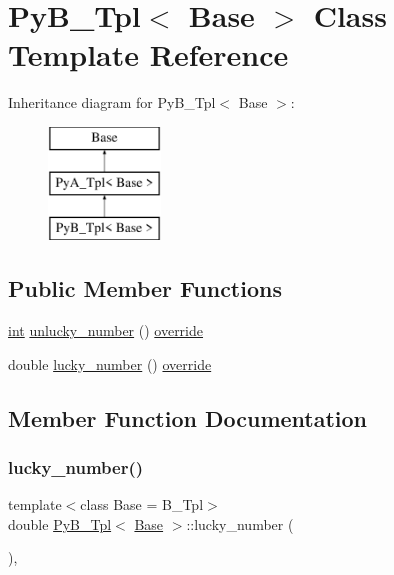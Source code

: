 \hypertarget{class_py_b___tpl}{}\section{Py\+B\+\_\+\+Tpl$<$ Base $>$ Class Template Reference}
\label{class_py_b___tpl}
Inheritance diagram for Py\+B\+\_\+\+Tpl$<$ Base $>$\+:\begin{figure}[H]
\begin{center}
\leavevmode
\includegraphics[height=3.000000cm]{class_py_b___tpl}
\end{center}
\end{figure}
\subsection*{Public Member Functions}
\begin{DoxyCompactItemize}
\item 
\mbox{\hyperlink{warnings_8h_a74f207b5aa4ba51c3a2ad59b219a423b}{int}} \mbox{\hyperlink{class_py_b___tpl_a2bd1a6cc651f095b0ef6d2fc88a1650a}{unlucky\+\_\+number}} () \mbox{\hyperlink{dictobject_8h_a055cf4fd16bde9bce026127362cee1a3}{override}}
\item 
double \mbox{\hyperlink{class_py_b___tpl_a256c384f61a73057aa14de6b322d320a}{lucky\+\_\+number}} () \mbox{\hyperlink{dictobject_8h_a055cf4fd16bde9bce026127362cee1a3}{override}}
\end{DoxyCompactItemize}


\subsection{Member Function Documentation}
\mbox{\label{class_py_b___tpl_a256c384f61a73057aa14de6b322d320a}} 
\subsubsection{\texorpdfstring{lucky\_number()}{lucky\_number()}}
{\footnotesize\ttfamily template$<$class Base  = B\+\_\+\+Tpl$>$ \\
double \mbox{\hyperlink{class_py_b___tpl}{Py\+B\+\_\+\+Tpl}}$<$ \mbox{\hyperlink{struct_base}{Base}} $>$\+::lucky\+\_\+number (\begin{DoxyParamCaption}{ }\end{DoxyParamCaption})\hspace{0.3cm}{\ttfamily [inline]}, {\ttfamily [override]}}

